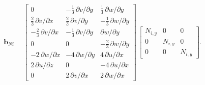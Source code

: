 \begin{equation}
\mathbf{b}_{Ni} = \begin{bmatrix}
0 &  - \tfrac{1}{3} \, \partial v / \partial y & \tfrac{1}{3} \, \partial w / \partial y  \\
\tfrac{2}{3} \, \partial v / \partial x &  \tfrac{2}{3} \, \partial v / \partial y & - \tfrac{1}{3} \, \partial w / \partial y  \\
-\tfrac{2}{3} \, \partial v / \partial x  & -\tfrac{1}{3} \, \partial v / \partial y & \partial w / \partial y \\
0 & 0 & - \tfrac{2}{3} \, \partial w / \partial y   \\
- 2 \, \partial w / \partial x &  - 4 \, \partial w / \partial y & 4 \,  \partial u / \partial x  \\
2 \, \partial u / \partial z &  0 & - 4 \, \partial u / \partial x  \\
0 &  2 \, \partial v / \partial x &  2 \, \partial w / \partial x  \end{bmatrix} \, \begin{bmatrix}
N_{i,y} &  0 & 0  \\
0 & N_{i,y} & 0  \\
0 & 0 & N_{i,y}  \end{bmatrix}. 
\end{equation}

